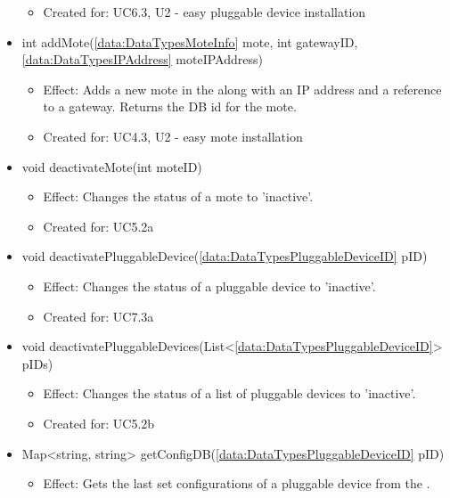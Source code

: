 \begin{description}
\begin{itemize}[noitemsep,nolistsep,leftmargin=-.25cm]
\begin{itemize}[noitemsep,nolistsep]
\item Created for: UC6.3, U2 - easy pluggable device installation
        \end{itemize}
      \item \textsf{int addMote(\ref{data:DataTypesMoteInfo} mote, int gatewayID, \ref{data:DataTypesIPAddress} moteIPAddress)}
        \begin{itemize}[noitemsep,nolistsep]
           \item Effect: Adds a new mote in the  along with an IP address and a reference to a gateway. Returns the DB id for the mote.
\item Created for: UC4.3, U2 - easy mote installation
        \end{itemize}
      \item \textsf{void deactivateMote(int moteID)}
        \begin{itemize}[noitemsep,nolistsep]
           \item Effect: Changes the status of a mote to 'inactive'.
\item Created for: UC5.2a
        \end{itemize}
      \item \textsf{void deactivatePluggableDevice(\ref{data:DataTypesPluggableDeviceID} pID)}
        \begin{itemize}[noitemsep,nolistsep]
           \item Effect: Changes the status of a pluggable device to 'inactive'.
\item Created for: UC7.3a
        \end{itemize}
      \item \textsf{void deactivatePluggableDevices(List\textless{}\ref{data:DataTypesPluggableDeviceID}\textgreater{} pIDs)}
        \begin{itemize}[noitemsep,nolistsep]
           \item Effect: Changes the status of a list of pluggable devices to 'inactive'.
\item Created for: UC5.2b
        \end{itemize}
      \item \textsf{Map\textless{}string, string\textgreater{} getConfigDB(\ref{data:DataTypesPluggableDeviceID} pID)}
        \begin{itemize}[noitemsep,nolistsep]
           \item Effect: Gets the last set configurations of a pluggable device from the .

\end{itemize}
\end{itemize}
\end{description}
